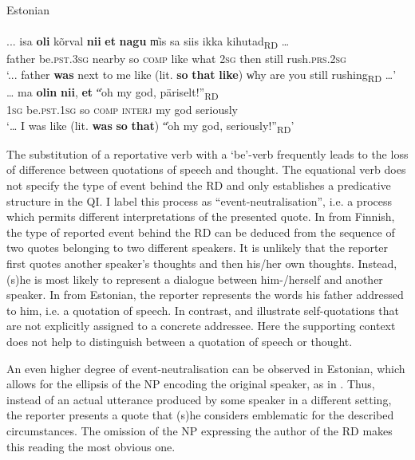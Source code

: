 \documentclass[output=paper,colorlinks,citecolor=brown]{langscibook}
\begin{document}
\ea\label{ex:teptiuk:7} {Estonian}\\
 \label{ex:teptiuk:7a}\\
\gll ... isa \textbf{oli} kõrval \textbf{nii} \textbf{et} \textbf{nagu} \|mis sa siis ikka kihutad\|\textsubscript{RD} … \\
{} father be.\textsc{pst}.3\textsc{sg} nearby so \textsc{comp} like {\db}what 2\textsc{sg} then still rush.\textsc{prs.}2\textsc{sg}\\
\glt ‘... father \textbf{was} next to me like (lit. \textbf{so} \textbf{that} \textbf{like}) \|why are you still rushing\|\textsubscript{RD} …’
 \label{ex:teptiuk:7b}\\
\gll … ma \textbf{olin} \textbf{nii}, \textbf{et} \|“oh my god, päriselt!”\|\textsubscript{RD}\\
{} {1}\textsc{sg} {be.}\textsc{pst}{.1}\textsc{sg} {so} \textsc{comp} {\db}{\db}\textsc{interj} my god seriously\\
\glt ‘… I was like (lit. \textbf{was} \textbf{so} \textbf{that}) \|“oh my god, seriously!”\|\textsubscript{RD}’
\z
\z

The substitution of a reportative verb with a ‘be’-verb frequently leads to the loss of difference between quotations of speech and thought. The equational verb does not specify the type of event behind the RD and only establishes a predicative structure in the QI. I label this process as “event-neutralisation”, i.e. a process which permits different interpretations of the presented quote. In  from Finnish, the type of reported event behind the RD can be deduced from the sequence of two quotes belonging to two different speakers. It is unlikely that the reporter first quotes another speaker’s thoughts and then his/her own thoughts. Instead, (s)he is most likely to represent a dialogue between him-/herself and another speaker. In  from Estonian, the reporter represents the words his father addressed to him, i.e. a quotation of speech. In contrast,  and  illustrate self-quotations that are not explicitly assigned to a concrete addressee. Here the supporting context does not help to distinguish between a quotation of speech or thought.

An even higher degree of event-neutralisation can be observed in Estonian, which allows for the ellipsis of the NP encoding the original speaker, as in . Thus, instead of an actual utterance produced by some speaker in a different setting, the reporter presents a quote that (s)he considers emblematic for the described circumstances. The omission of the NP expressing the author of the RD makes this reading the most obvious one.
\end{document}
